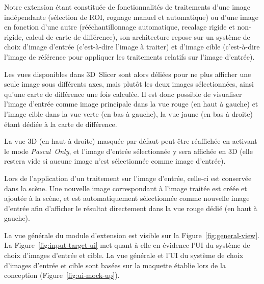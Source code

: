 \documentclass{article}
\begin{document}
{{{            \bigskip

            Notre extension étant constituée de fonctionnalités de traitements d'une image indépendante (sélection de ROI, rognage manuel et automatique) ou d'une image en fonction d'une autre (rééchantillonnage automatique, recalage rigide et non-rigide, calcul de carte de différence), son architecture repose sur un système de choix d'image d'entrée (c'est-à-dire l'image à traiter) et d'image cible (c'est-à-dire l'image de référence pour appliquer les traitements relatifs sur l'image d'entrée).

            Les vues disponibles dans 3D~Slicer sont alors déliées pour ne plus afficher une seule image sous différents axes, mais plutôt les deux images sélectionnées, ainsi qu'une carte de différence une fois calculée. Il est donc possible de visualiser l'image d'entrée comme image principale dans la vue rouge (en haut à gauche) et l'image cible dans la vue verte (en bas à gauche), la vue jaune (en bas à droite) étant dédiée à la carte de différence.

            La vue 3D (en haut à droite) masquée par défaut peut-être réaffichée en activant le mode \textit{Pascal~Only}, et l'image d'entrée sélectionnée y sera affichée en 3D (elle restera vide si aucune image n'est sélectionnée comme image d'entrée).

            \bigskip

            Lors de l'application d'un traitement sur l'image d'entrée, celle-ci est conservée dans la scène. Une nouvelle image correspondant à l'image traitée est créée et ajoutée à la scène, et est automatiquement sélectionnée comme nouvelle image d'entrée afin d'afficher le résultat directement dans la vue rouge dédié (en haut à gauche).

            \bigskip

            La vue générale du module d'extension est visible sur la Figure~\ref{fig:general-view}. La Figure~\ref{fig:input-target-ui} met quant à elle en évidence l'UI du système de choix d'images d'entrée et cible. La vue générale et l'UI du système de choix d'images d'entrée et cible sont basées sur la maquette établie lors de la conception (Figure~\ref{fig:ui-mock-up}).

}}}
\end{document}
